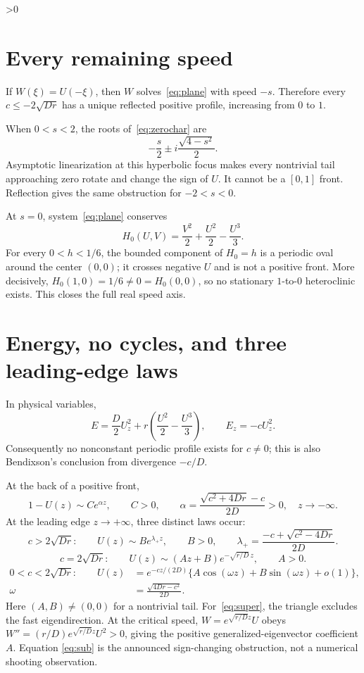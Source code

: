 \documentclass[9pt]{extarticle}
\begin{document}
\ifnum\CRevisionRound>0
\section{Every remaining speed}
If $W(\xi)=U(-\xi)$, then $W$ solves~\eqref{eq:plane} with speed $-s$.
Therefore every $c\le-2\sqrt{Dr}$ has a unique reflected positive profile,
increasing from $0$ to $1$.

When $0<s<2$, the roots of~\eqref{eq:zerochar} are
\[
 -\frac{s}{2}\mathbin\pm i\frac{\sqrt{4-s^2}}2.
\]
Asymptotic linearization at this hyperbolic focus makes every nontrivial tail
approaching zero rotate and change the sign of $U$.  It cannot be a
$[0,1]$ front.  Reflection gives the same obstruction for $-2<s<0$.

At $s=0$, system~\eqref{eq:plane} conserves
\begin{equation}\label{eq:H0}
 H_0(U,V)=\frac{V^2}{2}+\frac{U^2}{2}-\frac{U^3}{3}.
\end{equation}
For every $0<h<1/6$, the bounded component of $H_0=h$ is a periodic oval
around the center $(0,0)$; it crosses negative $U$ and is not a positive
front.  More decisively, $H_0(1,0)=1/6\ne0=H_0(0,0)$, so no stationary
$1$-to-$0$ heteroclinic exists.  This closes the full real speed axis.

\section{Energy, no cycles, and three leading-edge laws}
In physical variables,
\begin{equation}\label{eq:energy}
 E=\frac D2U_z^2+r\left(\frac{U^2}{2}-\frac{U^3}{3}\right),
 \qquad E_z=-cU_z^2.
\end{equation}
Consequently no nonconstant periodic profile exists for $c\ne0$; this is
also Bendixson's conclusion from divergence $-c/D$.

At the back of a positive front,
\[
 1-U(z)\sim C e^{\alpha z},\qquad C>0,\qquad
 \alpha=\frac{\sqrt{c^2+4Dr}-c}{2D}>0,\quad z\to-\infty.
\]
At the leading edge $z\to+\infty$, three distinct laws occur:
\begin{equation}\label{eq:super}
 c>2\sqrt{Dr}:\qquad
 U(z)\sim B e^{\lambda_+z},\qquad B>0,\qquad
 \lambda_+=\frac{-c+\sqrt{c^2-4Dr}}{2D}.
\end{equation}
\begin{equation}\label{eq:critical}
 c=2\sqrt{Dr}:\qquad
 U(z)\sim(Az+B)e^{-\sqrt{r/D}\,z},\qquad A>0.
\end{equation}
\begin{equation}\label{eq:sub}
 \begin{split}
 0<c<2\sqrt{Dr}:\qquad
 U(z)&=e^{-cz/(2D)}\{A\cos(\omega z)+B\sin(\omega z)+o(1)\},\\
 \omega&=\frac{\sqrt{4Dr-c^2}}{2D}.
 \end{split}
\end{equation}
Here $(A,B)\ne(0,0)$ for a nontrivial tail.
For~\eqref{eq:super}, the triangle excludes the fast eigendirection.  At the
critical speed, $W=e^{\sqrt{r/D}z}U$ obeys
$W''=(r/D)e^{\sqrt{r/D}z}U^2>0$, giving the positive
generalized-eigenvector coefficient $A$.  Equation
\eqref{eq:sub} is the announced sign-changing obstruction, not a numerical
shooting observation.
\fi
\end{document}
